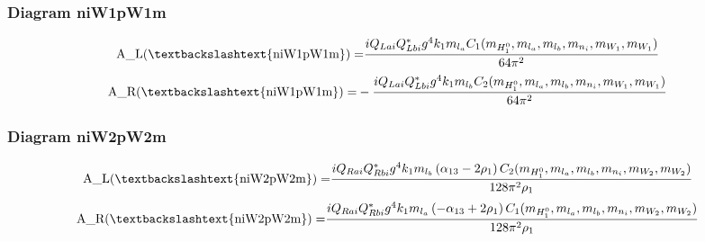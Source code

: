 \documentclass{article}
\begin{document}
\subsubsection{Diagram niW1pW1m}
\begin{align*}
\mathtt{\text{A\_L(\textbackslashtext\{niW1pW1m\})}} = & \frac{i Q_{Lai} Q_{Lbi}^* g^{4} k_{1} m_{l_a} C_1(m_{H_1^0}, m_{l_a}, m_{l_b}, m_{n_i}, m_{W_1}, m_{W_1})}{64 \pi^{2}} 
\end{align*}
\begin{align*}
\mathtt{\text{A\_R(\textbackslashtext\{niW1pW1m\})}} = &- \frac{i Q_{Lai} Q_{Lbi}^* g^{4} k_{1} m_{l_b} C_2(m_{H_1^0}, m_{l_a}, m_{l_b}, m_{n_i}, m_{W_1}, m_{W_1})}{64 \pi^{2}} 
\end{align*}
\subsubsection{Diagram niW2pW2m}
\begin{align*}
\mathtt{\text{A\_L(\textbackslashtext\{niW2pW2m\})}} = & \frac{i Q_{Rai} Q_{Rbi}^* g^{4} k_{1} m_{l_b} \left(\alpha_{13} - 2 \rho_{1}\right) C_2(m_{H_1^0}, m_{l_a}, m_{l_b}, m_{n_i}, m_{W_2}, m_{W_2})}{128 \pi^{2} \rho_{1}} 
\end{align*}
\begin{align*}
\mathtt{\text{A\_R(\textbackslashtext\{niW2pW2m\})}} = & \frac{i Q_{Rai} Q_{Rbi}^* g^{4} k_{1} m_{l_a} \left(- \alpha_{13} + 2 \rho_{1}\right) C_1(m_{H_1^0}, m_{l_a}, m_{l_b}, m_{n_i}, m_{W_2}, m_{W_2})}{128 \pi^{2} \rho_{1}} 
\end{align*}
\end{document}

